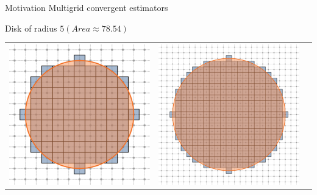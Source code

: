 \begin{frame}
{Motivation}
{Multigrid convergent estimators}

\footnotesize

\center
Disk of radius $5 (Area\approx78.54)$ 

\center
\begin{tabular}{ccc}
\includegraphics[scale=0.2]{figures/motivation/digital-geometric-estimators/multigrid/h1.png} &
\includegraphics[scale=0.2]{figures/motivation/digital-geometric-estimators/multigrid/h05.png} &

\end{tabular}
\end{frame}
